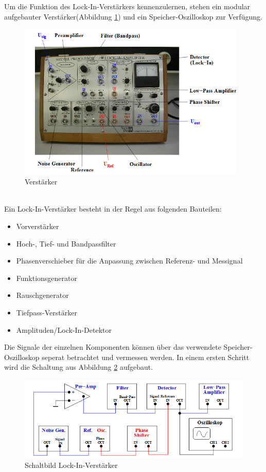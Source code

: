 Um die Funktion des Lock-In-Verstärkers kennenzulernen, stehen ein modular
aufgebauter Verstärker(Abbildung \ref{fig:verstärker}) und ein
Speicher-Oszilloskop zur Verfügung.
\begin{figure}[h]
  \centering
  \includegraphics[height=7.5cm]{Bilder/Verstaerker.jpg}
  \caption{Verstärker\cite{303}}
  \label{fig:verstärker}
\end{figure}
\\
Ein Lock-In-Verstärker besteht in der Regel aus folgenden Bauteilen:
\begin{itemize}
  \item Vorverstärker
  \item Hoch-, Tief- und Bandpassfilter
  \item Phasenverschieber für die Anpassung zwischen Referenz- und Messignal
  \item Funktionsgenerator
  \item Rauschgenerator
  \item Tiefpass-Verstärker
  \item Amplituden/Lock-In-Detektor
\end{itemize}
Die Signale der einzelnen Komponenten können über das verwendete
Speicher-Oszilloskop seperat betrachtet und vermessen werden.
\newpage
In einem ersten Schritt wird die Schaltung aus Abbildung \ref{fig:schalt}
aufgebaut.
\begin{figure}[h]
  \centering
  \includegraphics[width=\textwidth]{Bilder/Schaltung.jpg}
  \caption{Schaltbild Lock-In-Verstärker\cite{303}}
  \label{fig:schalt}
\end{figure}
